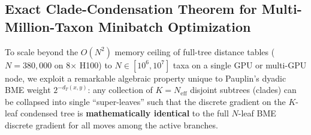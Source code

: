 \documentclass[11pt,a4paper]{article}
\theoremstyle{definition}
\begin{document}
\subsection{Exact Clade-Condensation Theorem for Multi-Million-Taxon Minibatch Optimization}

To scale beyond the $O(N^2)$ memory ceiling of full-tree distance tables ($N = 380{,}000$ on 8$\times$ H100) to $N \in [10^6, 10^7]$ taxa on a single GPU or multi-GPU node, we exploit a remarkable algebraic property unique to Pauplin's dyadic BME weight $2^{-d_T(x,y)}$: any collection of $K = N_{\text{eff}}$ disjoint subtrees (clades) can be collapsed into single ``super-leaves'' such that the discrete gradient on the $K$-leaf condensed tree is \textbf{mathematically identical} to the full $N$-leaf BME discrete gradient for all moves among the active branches.
\end{document}
